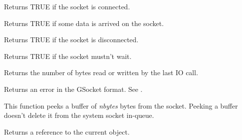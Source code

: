 Returns TRUE if the socket is connected.

\label{wxsocketbaseisdata}


Returns TRUE if some data is arrived on the socket. 

\label{wxsocketbasedisconnected}


Returns TRUE if the socket is disconnected.

\label{wxsocketbasenowait}


Returns TRUE if the socket mustn't wait.

\label{wxsocketbaselastcount}


Returns the number of bytes read or written by the last IO call.

\label{wxsocketbaselasterror}


Returns an error in the GSocket format. See . 

%
%
\label{wxsocketbasepeek}


This function peeks a buffer of {\it nbytes} bytes from the socket. Peeking a buffer
doesn't delete it from the system socket in-queue.





Returns a reference to the current object.


\\
\\

